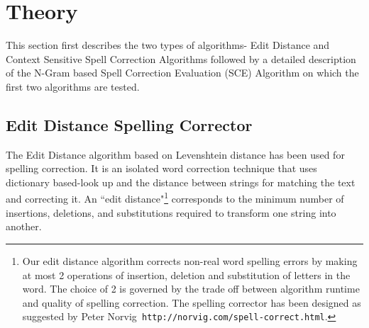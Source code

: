 \documentclass[preprint,11pt]{elsarticle}
\begin{document}
\section{Theory}
\label{spell:algo}
%
%
%
This section first describes the two types of algorithms- Edit Distance and Context Sensitive Spell Correction Algorithms followed by a detailed description of the N-Gram based Spell Correction Evaluation (SCE) Algorithm on which the first two algorithms are tested.

\subsection{ Edit Distance Spelling Corrector}
\label{spell:algorithm}
The Edit Distance algorithm based on Levenshtein distance\cite{levenshtein1966binary} has been used for spelling correction. It is an isolated word correction technique that uses dictionary based-look up and the distance between strings for matching the text and correcting it. An ``edit distance"\footnote{Our edit distance algorithm corrects non-real word spelling errors by making at most 2 operations of insertion, deletion and substitution of letters in the word. The choice of 2 is governed by the trade off between algorithm runtime and quality of spelling correction. The spelling corrector has been designed as suggested by Peter Norvig\texttt{ http://norvig.com/spell-correct.html}.} corresponds to the minimum number of insertions, deletions, and substitutions required to transform one string into another. %
\end{document}
